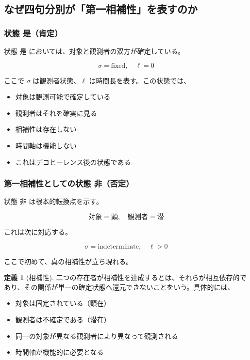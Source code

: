 \documentclass[12pt,a4paper]{article}
\theoremstyle{definition}
\newtheorem{definition}{定義}[section]
\begin{document}
\subsection{なぜ四句分別が「第一相補性」を表すのか}

\subsubsection{状態 是（肯定）}

状態 是 においては、対象と観測者の双方が確定している。

\begin{equation}
\sigma = \text{fixed}, \quad \ell = 0
\end{equation}

ここで $\sigma$ は観測者状態、$\ell$ は時間長を表す。この状態では、
\begin{itemize}
    \item 対象は観測可能で確定している
    \item 観測者はそれを確実に見る
    \item 相補性は存在しない
    \item 時間軸は機能しない
    \item これはデコヒーレンス後の状態である
\end{itemize}

\subsubsection{第一相補性としての状態 非（否定）}

状態 非 は根本的転換点を示す。

\begin{equation}
\text{対象} = \text{顕}, \quad \text{観測者} = \text{潜}
\end{equation}

これは次に対応する。

\begin{equation}
\sigma = \text{indeterminate}, \quad \ell > 0
\end{equation}

ここで初めて、真の相補性が立ち現れる。

\begin{definition}[相補性]
二つの存在者が相補性を達成するとは、それらが相互依存的であり、その関係が単一の確定状態へ還元できないことをいう。具体的には、
\begin{itemize}
    \item 対象は固定されている（顕在）
    \item 観測者は不確定である（潜在）
    \item 同一の対象が異なる観測者により異なって観測される
    \item 時間軸が機能的に必要となる
\end{itemize}
\end{definition}
\end{document}
